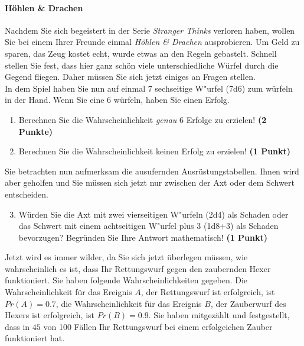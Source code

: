 \documentclass[a4paper, 10pt]{scrartcl}\usepackage[]{graphicx}\usepackage[]{xcolor}
\begin{document}
\paragraph{H{\"o}hlen \& Drachen}



Nachdem Sie sich begeistert in der Serie \textit{Stranger Thinks} verloren
haben, wollen Sie bei einem Ihrer Freunde einmal \textit{H{\"o}hlen \& Drachen}
ausprobieren. Um Geld zu sparen, das Zeug kostet echt, wurde etwas an den
Regeln gebastelt. Schnell stellen Sie fest, dass hier ganz sch{\"o}n viele
unterschiedliche W{\"u}rfel durch die Gegend fliegen. Daher m{\"u}ssen Sie sich
jetzt einiges an Fragen stellen. \\%

In dem Spiel haben Sie nun auf einmal 7 sechseitige W{"u}rfel (7d6) zum w{\"u}rfeln in der Hand. Wenn Sie eine 6 w{\"u}rfeln,
haben Sie einen Erfolg.

\begin{enumerate}
\item Berechnen Sie die Wahrscheinlichkeit \textit{genau}
  6 Erfolge zu erzielen!  \textbf{(2 Punkte)}
\item Berechnen Sie die Wahrscheinlichkeit keinen Erfolg zu erzielen!
  \textbf{(1 Punkt)}
\end{enumerate}

Sie betrachten nun aufmerksam die ausufernden Ausr{\"u}stungstabellen. Ihnen
wird aber geholfen und Sie m{\"u}ssen sich jetzt nur zwischen der Axt oder dem
Schwert entscheiden.

\begin{enumerate}
  \setcounter{enumi}{2}
\item W{\"u}rden Sie die Axt mit zwei vierseitigen W{"u}rfeln (2d4) als Schaden oder
  das Schwert mit einem achtseitigen W{"u}rfel plus 3 (1d8+3) als Schaden bevorzugen?
  Begr{\"u}nden Sie Ihre Antwort mathematisch! \textbf{(1 Punkt)}
\end{enumerate}

Jetzt wird es immer wilder, da Sie sich jetzt {\"u}berlegen m{\"u}ssen, wie
wahrscheinlich es ist, dass Ihr Rettungswurf gegen den zaubernden Hexer
funktioniert. Sie haben folgende Wahrscheinlichkeiten gegeben. Die
Wahrscheinlichkeit f{\"u}r das Ereignis $A$, der Rettungswurf ist erfolgreich,
ist $Pr(A) = 0.7$, die Wahrscheinlichkeit f{\"u}r das Ereignis $B$,
der Zauberwurf des Hexers ist erfolgreich, ist $Pr(B) = 0.9$. Sie
haben mitgez{\"a}hlt und festgestellt, dass in $45$ von 100 F{\"a}llen
Ihr Rettungswurf bei einem erfolgeichen Zauber funktioniert hat.  
\end{document}
